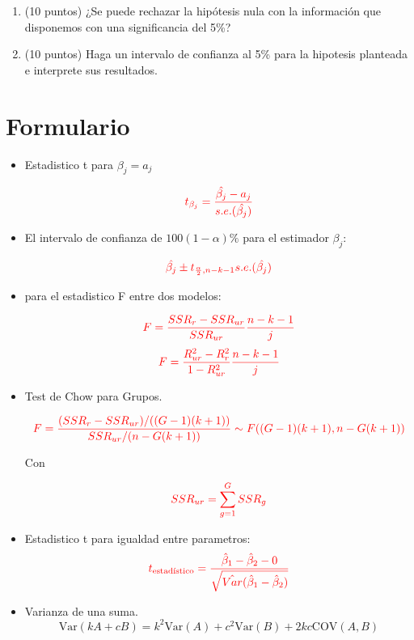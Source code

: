 \documentclass[10pt,a4paper]{article}
\begin{document}
\begin{enumerate}
\begin{enumerate}
    \item (10 puntos) ¿Se puede rechazar la hipótesis nula con la información que disponemos con una significancia del 5\%?

    \item (10 puntos) Haga un intervalo de confianza al 5\% para la hipotesis planteada e interprete sus resultados.

\end{enumerate}


\end{enumerate}


 
\section*{Formulario}
\begin{itemize}

\item Estadistico t para $\beta_j = a_j$

$$\color{red}{t_{\beta_j}=\frac{\hat{\beta_j}-a_j}{s.e.(\hat{\beta_j})}}$$

\item El intervalo de confianza de $100(1-\alpha)\%$ para el estimador $\beta_j$:

$${\color{red}\hat{\beta_j} \pm t_{\frac{\alpha}{2},n-k-1}s.e.(\hat{\beta_j})}$$


\item para el estadistico F entre dos modelos:

$$\color{red}{F=\frac{SSR_r-SSR_{ur}}{SSR_{ur}}\frac{n-k-1}{j}}$$
$$\color{red}{F=\frac{R^2_{ur}-R^2_{r}}{1-R^2_{ur}}\frac{n-k-1}{j}}$$

\item Test de Chow para Grupos.

    \[\color{red}
    F = \frac{(SSR_r - SSR_{ur}) / ((G - 1)(k + 1))}{SSR_{ur} / (n - G(k + 1))} \sim F((G - 1)(k + 1), n - G(k + 1))
    \]

Con

$$\color{red}SSR_{ur} = \sum_{g=1}^G SSR_g$$

\item Estadistico t para igualdad entre parametros:
 \[\color{red}t_{\text{estadístico}} = \frac{\hat{\beta}_1 - \hat{\beta}_2 - 0}{\sqrt{\hat{Var}(\hat{\beta}_1 - \hat{\beta}_2)}}\]


\item  Varianza de una suma.
{\color{red}
$$\text{Var}(kA + cB) = k^2\text{Var}(A) + c^2\text{Var}(B) + 2kc\text{COV}(A, B)$$}


\end{itemize}
\end{document}
